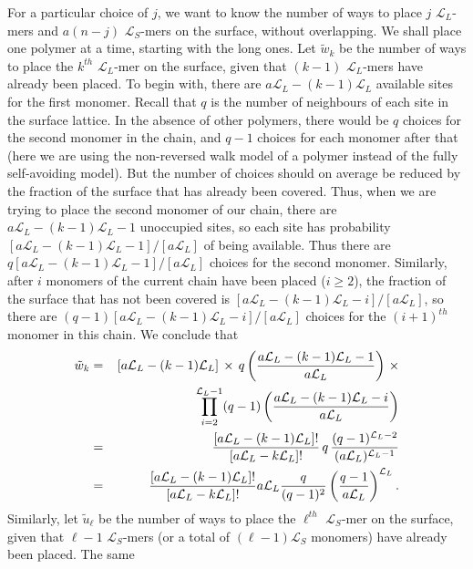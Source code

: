 \documentclass[journal=mamobx,manuscript=article]{achemso}
\newcommand{\leng}{\mathcal{L}}
\begin{document}
For a particular choice of $j$, we want to know the number of ways to place $j$ $\leng_L$-mers 
and $a(n-j)$ $\leng_S$-mers on the surface,
without overlapping.  %
We shall place one polymer at a time, starting with the long ones.
Let $\tilde{w}_k$ be the number of ways to place the $k^{th}$ $\leng_L$-mer on the surface, given that
$(k-1)$ $\leng_L$-mers have already been placed.  
To begin with, there are $a\leng_L-(k-1)\leng_L$ available sites for the first monomer.  Recall that  $q$ is the number of
neighbours of each site in the surface lattice.
In the absence of other polymers, there would be $q$ choices for the second monomer in the chain,
and $q-1$ choices for each monomer after that (here we are using the non-reversed walk model of a polymer
instead of the fully self-avoiding model).  But the number of choices should on average be reduced 
by the fraction of the surface that has already been covered.  
Thus, when we are trying to place the second monomer of our chain, there are
$a\leng_L-(k-1)\leng_L-1$ unoccupied sites, so each site has 
probability $[a\leng_L-(k-1)\leng_L-1]/[a\leng_L]$ of being available.  
Thus there are $q[a\leng_L-(k-1)\leng_L-1]/[a\leng_L]$ choices for the second monomer.  
Similarly, after $i$ monomers of the current chain have been placed ($i\geq 2$), the fraction of the
surface that has not been covered is $[a\leng_L-(k-1)\leng_L-i]/[a\leng_L]$, so there are 
$(q-1)[a\leng_L-(k-1)\leng_L-i]/[a\leng_L]$ choices for the $(i+1)^{th}$ monomer in this chain.  
We conclude that 
\begin{eqnarray}
   \tilde{w}_k  & = &   [a\leng_L-(k-1)\leng_L]\,\times \,q\left(\frac{ a\leng_L-(k-1)\leng_L-1}{a\leng_L}\right)    \,\times
   \nonumber    \\
   & &    \hspace{22mm}
     \prod_{i=2}^{\leng_L-1}(q-1)\left(\frac{ a\leng_L-(k-1)\leng_L-i}{a\leng_L}\right)  
      \nonumber \\
 & = &    \frac{[a\leng_L-(k-1)\leng_L]!}{[a\leng_L-k\leng_L]!} \,q\,  \frac{(q-1)^{\leng_L-2}}{(a\leng_L)^{\leng_L-1}}  
     \nonumber    \\
     & = &    \frac{[a\leng_L-(k-1)\leng_L]!}{[a\leng_L-k\leng_L]!}   a\leng_L \frac{q}{(q-1)^2}\left(  \frac{q-1}{a\leng_L}\right)^{\leng_L}.
     \label{eq.wk2}
\end{eqnarray}
Similarly, let $\tilde{u}_{\ell}$ be the number of ways to place the $\ell^{th}$ $\leng_S$-mer on the surface, given that
${\ell}-1$ $\leng_S$-mers (or a total of $(\ell-1)\leng_S$ monomers) have already been placed.   The same 
\end{document}
